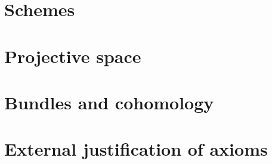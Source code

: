 \documentclass{zariski}
\begin{document}
\section{Schemes}


\section{Projective space}


\section{Bundles and cohomology}


\section{External justification of axioms}


\printindex
\end{document}
